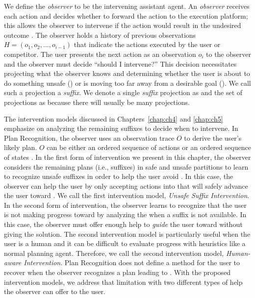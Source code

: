 We define the \textit{observer} to be the intervening assistant agent. 
An \textit{observer} receives each action and decides whether to forward the action to the execution platform;
this allows the observer to intervene if the action would result in the undesired outcome \undesired.  
The observer holds a history of previous observations $H = (o_1, o_2, \ldots, o_{i-1})$ that indicate the actions executed by the user or competitor.
The user presents the next action as an observation $o_{i}$ to the observer and the observer must decide ``should I intervene?''
This decision necessitates projecting what the observer knows and determining whether the user is about to do something unsafe (\undesired) 
or is moving too far away from a desirable goal (\desired).
We call such a projection a \textit{suffix}.
We denote a single  \textit{suffix} projection as \Suffix and the set of projections as \Suffixes because there will usually be many projections.

  
The intervention models discussed in Chapters~\ref{chap:ch4} and \ref{chap:ch5} emphasize on analyzing the remaining suffixes to decide when to intervene.
In Plan Recognition, the observer uses an observation trace $O$ to derive the user's likely plan. $O$ can be either an ordered sequence of actions  \cite{ramirez2009plan,ramirez2010probabilistic} or an ordered sequence of states \cite{sohrabi2016plan}.
In the first form of intervention we present in this chapter, the observer considers the remaining plans (i.e., suffixes) in safe and unsafe partitions to learn to recognize unsafe suffixes in order to help the user avoid \undesired. 
In this case, the observer can help the user by only accepting actions into \historyDef that will safely advance the user toward \desired.
We call the first intervention model, \textit{Unsafe Suffix Intervention}.
In the second form of intervention, the observer learns to recognize that the user is not making progress toward \desired by analyzing the \historyDef when a suffix is not available. In this case,  the observer must offer enough help to \textit{guide} the user toward \desired without giving the solution. 
The second intervention model is particularly useful when the user is a human and it can be difficult to evaluate progress with heuristics like a normal planning agent.
Therefore, we call the second intervention model, \textit{Human-aware Intervention}.
Plan Recognition does not define a method for the user to recover when the observer recognizes a plan leading to \undesired. 
With the proposed intervention models, we address that limitation with two different types of help the observer can offer to the user.


